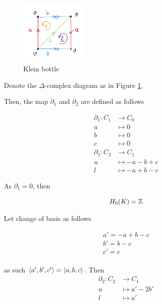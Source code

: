 \documentclass{article}
\begin{document}
\begin{figure}[h]
\centering
\includegraphics[width=0.3\textwidth]{klein.jpg}
\caption{Klein bottle}
\label{fig_klein}
\end{figure}

Denote the $\Delta$-complex diagram as in Figure \ref{fig_klein},

\begin{center}
\end{center}

Then, the map $\partial_1$ and $\partial_2$ are defined as follows

\begin{align*}
    \partial_1: C_1 &\to C_0 \\
    a &\mapsto 0 \\
    b &\mapsto 0 \\
    c &\mapsto 0 \\
    \partial_2: C_2 &\to C_1 \\
    u &\mapsto -a -b +c \\
    l &\mapsto -a +b -c
\end{align*}

As $\partial_1 = 0$, then

$$
    H_0(K) = \mathbb{Z}
$$

Let change of basis as follows

\begin{align*}
    a' = -a + b - c \\
    b' = b - c \\
    c' = c \\
\end{align*}

as such $\langle a', b', c'\rangle = \langle a, b, c\rangle$. Then 
\begin{align*}
    \partial_2: C_2 &\to C_1 \\
    u &\mapsto a' - 2b' \\
    l &\mapsto a'
\end{align*}
\end{document}
